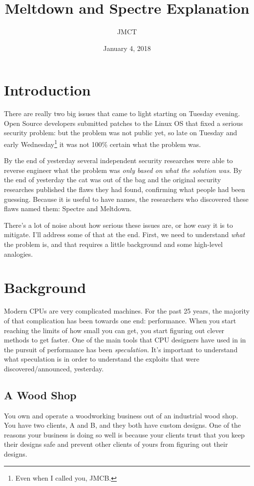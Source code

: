 \documentclass{article}
\title{Meltdown and Spectre Explanation}
\author{JMCT}
\date{January 4, 2018}
\begin{document}
\maketitle

\section{Introduction}

There are really two big issues that came to light starting on Tuesday evening.
Open Source developers submitted patches to the Linux OS that fixed a serious
security problem: but the problem was not public yet, so late on Tuesday and
early Wednesday\footnote{Even when I called you, JMCB.} it was not 100\%
certain what the problem was.

By the end of yesterday several independent security researches were able to
reverse engineer what the problem was \emph{only based on what the solution
was}. By the end of yesterday the cat was out of the bag and the original
security researches published the flaws they had found, confirming what people
had been guessing. Because it is useful to have names, the researchers who
discovered these flaws named them: Spectre and Meltdown.

There's a lot of noise about how serious these issues are, or how easy it is to
mitigate. I'll address some of that at the end. First, we need to understand
\emph{what} the problem is, and that requires a little background and some
high-level analogies.

\section{Background}

Modern CPUs are very complicated machines. For the past 25 years, the majority
of that complication has been towards one end: performance. When you start
reaching the limits of how small you can get, you start figuring out clever
methods to get faster. One of the main tools that CPU designers have used in in
the pursuit of performance has been \emph{speculation}. It's important to
understand what speculation is in order to understand the exploits that were
discovered/announced, yesterday.

\subsection*{A Wood Shop}

You own and operate a woodworking business out of an industrial wood shop. You
have two clients, A and B, and they both have custom designs. One of the
reasons your business is doing so well is because your clients trust that you
keep their designs safe and prevent other clients of yours from figuring out
their designs.
\end{document}
